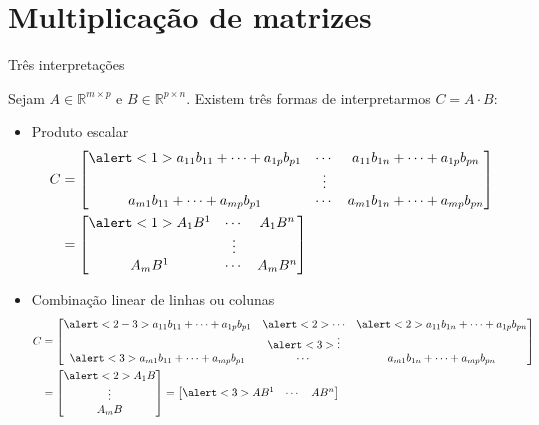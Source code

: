 \documentclass[]{beamer}
\newcommand{\R}{\mathbb{R}}
\begin{document}
\section{Multiplicação de matrizes}

\begin{frame}{Três interpretações}

  Sejam $A \in \R^{m \times p}$ e $B \in \R^{p \times n}$. Existem
  três formas de interpretarmos $C = A \cdot B$:

  \begin{itemize}
  \item<only@1> Produto escalar
    \[
    \begin{split}
      C & =
      \begin{bmatrix}
        \alert<1>{a_{11} b_{11} + \cdots + a_{1p} b_{p1}} & \cdots &
        a_{11} b_{1n} + \cdots + a_{1p} b_{pn}\\
        & \vdots & \\
        a_{m1} b_{11} + \cdots + a_{mp} b_{p1} & \cdots & a_{m1}
        b_{1n} + \cdots + a_{mp} b_{pn}
      \end{bmatrix} \\
      & =
      \begin{bmatrix}
        \alert<1>{A_1 B^1} & \cdots & A_1 B^n \\
        & \vdots & \\
        A_m B^1 & \cdots & A_m B^n
      \end{bmatrix}
    \end{split}
    \]

    \item<only@2-3> Combinação linear de linhas ou colunas
    \[
    \begin{split}
      C & =
      \begin{bmatrix}
        \alert<2-3>{a_{11} b_{11} + \cdots + a_{1p} b_{p1}} & \alert<2>{\cdots} &
        \alert<2>{a_{11} b_{1n} + \cdots + a_{1p} b_{pn}}\\
        & \alert<3>{\vdots} & \\
        \alert<3>{a_{m1} b_{11} + \cdots + a_{mp} b_{p1}} & \cdots & a_{m1}
        b_{1n} + \cdots + a_{mp} b_{pn}
      \end{bmatrix} \\
      & =
      \begin{bmatrix}
        \alert<2>{A_1 B} \\
        \vdots \\
        A_m B
      \end{bmatrix}
      =
      \begin{bmatrix}
        \alert<3>{A B^1} & \cdots & A B^n \\
      \end{bmatrix}
    \end{split}
    \]


\end{itemize}
\end{frame}
\end{document}
